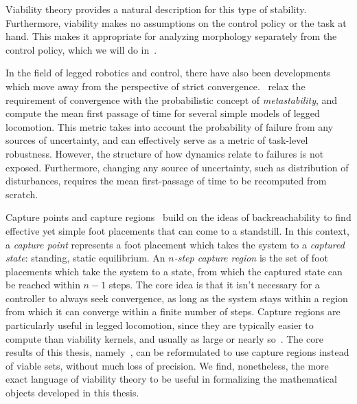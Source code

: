Viability theory provides a natural description for this type of stability. Furthermore, viability makes no assumptions on the control policy or the task at hand. This makes it appropriate for analyzing morphology separately from the control policy, which we will do in~\cite{heim2019beyond}. \par

In the field of legged robotics and control, there have also been developments which move away from the perspective of strict convergence.~\textcite{byl2009metastable} relax the requirement of convergence with the probabilistic concept of \emph{metastability}, and compute the mean first passage of time for several simple models of legged locomotion. This metric takes into account the probability of failure from any sources of uncertainty, and can effectively serve as a metric of task-level robustness.
However, the structure of how dynamics relate to failures is not exposed. Furthermore, changing any source of uncertainty, such as distribution of disturbances, requires the mean first-passage of time to be recomputed from scratch. \par

Capture points and capture regions~\cite{koolen2012capturability} build on the ideas of backreachability to find effective yet simple foot placements that can come to a standstill. In this context, a \emph{capture point} represents a foot placement which takes the system to a \emph{captured state}: standing, static equilibrium. An \emph{$n$-step capture region} is the set of foot placements which take the system to a state, from which the captured state can be reached within $n-1$ steps.
The core idea is that it isn't necessary for a controller to always seek convergence, as long as the system stays within a region from which it can converge within a finite number of steps.
Capture regions are particularly useful in legged locomotion, since they are typically easier to compute than viability kernels, and usually as large or nearly so~\cite{koolen2012capturability,zaytsev2018boundaries}. The core results of this thesis, namely~\cite{heim2019beyond,heim2019learnable}, can be reformulated to use capture regions instead of viable sets, without much loss of precision. We find, nonetheless, the more exact language of viability theory to be useful in formalizing the mathematical objects developed in this thesis. \par



